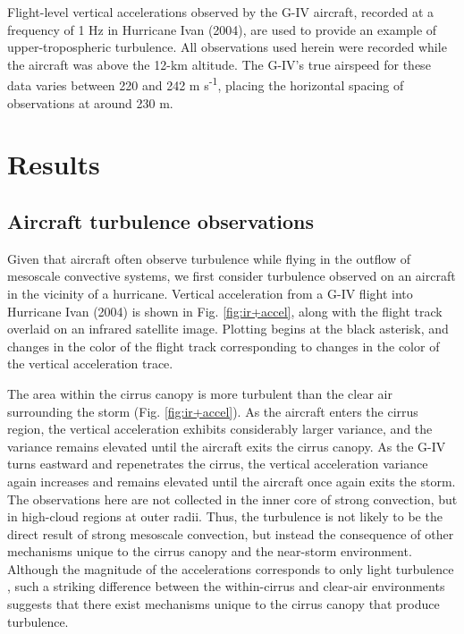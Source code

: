 Flight-level vertical accelerations observed by the G-IV aircraft, recorded at a frequency of 1 Hz in Hurricane Ivan (2004), are used to provide an example of upper-tropospheric turbulence.
All observations used herein were recorded while the aircraft was above the 12-km altitude.
The G-IV’s true airspeed for these data varies between 220 and 242 m s\textsuperscript{-1}, placing the horizontal spacing of observations at around 230 m.

\section{Results}

\subsection{Aircraft turbulence observations}

Given that aircraft often observe turbulence while flying in the outflow of mesoscale convective systems, we first consider turbulence observed on an aircraft in the vicinity of a hurricane.
Vertical acceleration from a G-IV flight into Hurricane Ivan (2004) is shown in Fig. \ref{fig:ir+accel}, along with the flight track overlaid on an infrared satellite image.
Plotting begins at the black asterisk, and changes in the color of the flight track corresponding to changes in the color of the vertical acceleration trace.

The area within the cirrus canopy is more turbulent than the clear air surrounding the storm (Fig. \ref{fig:ir+accel}).
As the aircraft enters the cirrus region, the vertical acceleration exhibits considerably larger variance, and the variance remains elevated until the aircraft exits the cirrus canopy.
As the G-IV turns eastward and repenetrates the cirrus, the vertical acceleration variance again increases and remains elevated until the aircraft once again exits the storm.
The observations here are not collected in the inner core of strong convection, but in high-cloud regions at outer radii.
Thus, the turbulence is not likely to be the direct result of strong mesoscale convection, but instead the consequence of other mechanisms unique to the cirrus canopy and the near-storm environment.
Although the magnitude of the accelerations corresponds to only light turbulence \citep{WMO1998}, such a striking difference between the within-cirrus and clear-air environments suggests that there exist mechanisms unique to the cirrus canopy that produce turbulence.

